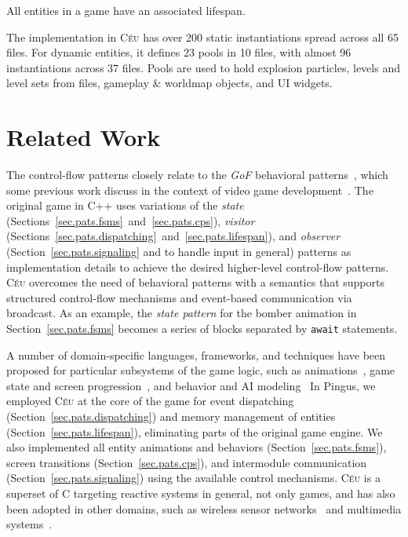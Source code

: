 \documentclass{vgtc}                          %
\newcommand{\CEU}{\textsc{C\'{e}u}\xspace}
\newcommand{\code}[1] {{\small{\texttt{#1}}}}
\begin{document}
All entities in a game have an associated lifespan.

The implementation in \CEU has over 200 static instantiations spread across all
65 files.
For dynamic entities, it defines 23 pools in 10 files, with almost 96
instantiations across 37 files.
Pools are used to hold explosion particles, levels and level sets from files,
gameplay \& worldmap objects, and UI widgets.

\section{Related Work}
\label{sec.related}

The control-flow patterns closely relate to the \emph{GoF} behavioral
patterns~\cite{gof}, which some previous work discuss in the context of video
game development~\cite{games.patterns,games.gof.2015,games.gof.2007}.
%
The original game in C++ uses variations of the
    \emph{state} (Sections~\ref{sec.pats.fsms}~and~\ref{sec.pats.cps}),
    \emph{visitor} (Sections~\ref{sec.pats.dispatching}~and~\ref{sec.pats.lifespan}), and
    \emph{observer} (Section~\ref{sec.pats.signaling} and to handle input in general)
patterns as implementation details to achieve the desired higher-level
control-flow patterns.
%
\CEU overcomes the need of behavioral patterns with a semantics that supports
structured control-flow mechanisms and event-based communication via broadcast.
%
As an example, the \emph{state pattern} for the bomber animation in
Section~\ref{sec.pats.fsms} becomes a series of blocks separated by
\code{await} statements.

A number of domain-specific languages, frameworks, and techniques have been
proposed for particular subsystems of the game logic, such as
animations~\cite{games.anims.2006,games.anims.2003,games.anims.1996,games.anims.1982},
game state and screen progression~\cite{games.fsms.2006.1,games.fsms.2006.2}, and
behavior and AI modeling~\cite{games.bts,games.bts.unreal}
%
In Pingus, we employed \CEU at the core of the game for event dispatching
(Section~\ref{sec.pats.dispatching}) and memory management of entities
(Section~\ref{sec.pats.lifespan}), eliminating parts of the original game
engine.
We also implemented all entity animations and behaviors
(Section~\ref{sec.pats.fsms}), screen transitions
(Section~\ref{sec.pats.cps}), and intermodule communication
(Section~\ref{sec.pats.signaling}) using the available control mechanisms.
%
\CEU is a superset of C targeting reactive systems in general, not only games,
and has also been adopted in other domains, such as
    wireless sensor networks~\cite{ceu.sensys13,ceu.terra} and
    multimedia systems~\cite{ceu.media.webmedia16}.
\end{document}
